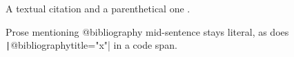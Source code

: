 A textual citation \citet{Quine:1948} and a parenthetical one
\citep{Skyrms:1996}.

Prose mentioning @bibliography mid-sentence stays literal, as does
\texttt|@bibliography{title="x"}| in a code span.


\renewcommand{\refname}{References}


